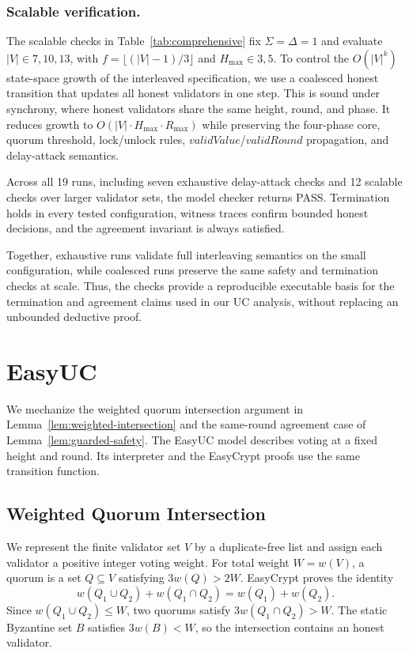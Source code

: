 \documentclass[conference,letterpaper,10pt]{IEEEtran}
\begin{document}
\subsubsection{Scalable verification.}

The scalable checks in Table~\ref{tab:comprehensive} fix $\Sigma=\Delta=1$ and evaluate $|V|\in{7,10,13}$, with $f=\lfloor(|V|-1)/3\rfloor$ and $H_{\max}\in{3,5}$. To control the $O(|V|^k)$ state-space growth of the interleaved specification, we use a coalesced honest transition that updates all honest validators in one step. This is sound under synchrony, where honest validators share the same height, round, and phase. It reduces growth to $O(|V|\cdot H_{\max}\cdot R_{\max})$ while preserving the four-phase core, quorum threshold, lock/unlock rules, $validValue$/$validRound$ propagation, and delay-attack semantics.

Across all 19 runs, including seven exhaustive delay-attack checks and 12 scalable checks over larger validator sets, the model checker returns PASS. Termination holds in every tested configuration, witness traces confirm bounded honest decisions, and the agreement invariant is always satisfied.

Together, exhaustive runs validate full interleaving semantics on the small configuration, while coalesced runs preserve the same safety and termination checks at scale. Thus, the checks provide a reproducible executable basis for the termination and agreement claims used in our UC analysis, without replacing an unbounded deductive proof.

\section{EasyUC}\label{sec:easyuc}

We mechanize the weighted quorum intersection argument in Lemma~\ref{lem:weighted-intersection} and the same-round agreement case of Lemma~\ref{lem:guarded-safety}. The EasyUC model describes voting at a fixed height and round. Its interpreter and the EasyCrypt proofs use the same transition function.

\subsection{Weighted Quorum Intersection}

We represent the finite validator set $V$ by a duplicate-free list and assign each validator a positive integer voting weight. For total weight $W=w(V)$, a quorum is a set $Q\subseteq V$ satisfying $3w(Q)>2W$. EasyCrypt proves the identity
\begin{equation*}
w(Q_1\cup Q_2)+w(Q_1\cap Q_2)=w(Q_1)+w(Q_2).
\end{equation*}
Since $w(Q_1\cup Q_2)\leq W$, two quorums satisfy $3w(Q_1\cap Q_2)>W$. The static Byzantine set $B$ satisfies $3w(B)<W$, so the intersection contains an honest validator.
\end{document}
